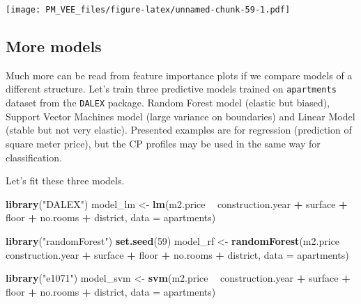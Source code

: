 \documentclass[12pt,]{krantz}
\newenvironment{Shaded}{\begin{snugshade}}{\end{snugshade}}
\newcommand{\DataTypeTok}[1]{\textcolor[rgb]{0.13,0.29,0.53}{#1}}
\newcommand{\DecValTok}[1]{\textcolor[rgb]{0.00,0.00,0.81}{#1}}
\newcommand{\KeywordTok}[1]{\textcolor[rgb]{0.13,0.29,0.53}{\textbf{#1}}}
\newcommand{\NormalTok}[1]{#1}
\newcommand{\OperatorTok}[1]{\textcolor[rgb]{0.81,0.36,0.00}{\textbf{#1}}}
\newcommand{\StringTok}[1]{\textcolor[rgb]{0.31,0.60,0.02}{#1}}
\theoremstyle{definition}
\theoremstyle{definition}
\theoremstyle{definition}
\theoremstyle{remark}
\begin{document}
\texttt{[image: PM\_VEE\_files/figure-latex/unnamed-chunk-59-1.pdf]}

\hypertarget{more-models}{%
\subsection{More models}\label{more-models}}

Much more can be read from feature importance plots if we compare models
of a different structure. Let's train three predictive models trained on
\texttt{apartments} dataset from the \texttt{DALEX} package. Random
Forest model \citep{R-randomForest} (elastic but biased), Support Vector
Machines model \citep{R-e1071} (large variance on boundaries) and Linear
Model (stable but not very elastic). Presented examples are for
regression (prediction of square meter price), but the CP profiles may
be used in the same way for classification.

Let's fit these three models.

\begin{Shaded}
\begin{Highlighting}[]
\KeywordTok{library}\NormalTok{(}\StringTok{"DALEX"}\NormalTok{)}
\NormalTok{model_lm <-}\StringTok{ }\KeywordTok{lm}\NormalTok{(m2.price }\OperatorTok{~}\StringTok{ }\NormalTok{construction.year }\OperatorTok{+}\StringTok{ }\NormalTok{surface }\OperatorTok{+}\StringTok{ }\NormalTok{floor }\OperatorTok{+}\StringTok{ }
\StringTok{                      }\NormalTok{no.rooms }\OperatorTok{+}\StringTok{ }\NormalTok{district, }\DataTypeTok{data =}\NormalTok{ apartments)}

\KeywordTok{library}\NormalTok{(}\StringTok{"randomForest"}\NormalTok{)}
\KeywordTok{set.seed}\NormalTok{(}\DecValTok{59}\NormalTok{)}
\NormalTok{model_rf <-}\StringTok{ }\KeywordTok{randomForest}\NormalTok{(m2.price }\OperatorTok{~}\StringTok{ }\NormalTok{construction.year }\OperatorTok{+}\StringTok{ }\NormalTok{surface }\OperatorTok{+}\StringTok{ }\NormalTok{floor }\OperatorTok{+}\StringTok{ }
\StringTok{                      }\NormalTok{no.rooms }\OperatorTok{+}\StringTok{ }\NormalTok{district, }\DataTypeTok{data =}\NormalTok{ apartments)}

\KeywordTok{library}\NormalTok{(}\StringTok{"e1071"}\NormalTok{)}
\NormalTok{model_svm <-}\StringTok{ }\KeywordTok{svm}\NormalTok{(m2.price }\OperatorTok{~}\StringTok{ }\NormalTok{construction.year }\OperatorTok{+}\StringTok{ }\NormalTok{surface }\OperatorTok{+}\StringTok{ }\NormalTok{floor }\OperatorTok{+}\StringTok{ }
\StringTok{                         }\NormalTok{no.rooms }\OperatorTok{+}\StringTok{ }\NormalTok{district, }\DataTypeTok{data =}\NormalTok{ apartments)}
\end{Highlighting}
\end{Shaded}
\end{document}
